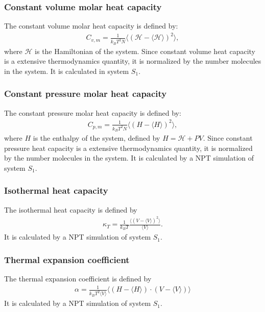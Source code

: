 \documentclass[aip,jcp,a4paper,preprint,unsortedaddress,onecolumn,fleqn]{revtex4-1}
\newcommand{\systemsb}{S_1}
\begin{document}

\subsubsection{Constant volume molar heat capacity}
The constant volume molar heat capacity is defined by:
\begin{align}
  C_{v,m} = \frac{1}{k_BT^2 N} \langle (\mathcal H - \langle\mathcal H\rangle)^2 \rangle,
\end{align}
where $\mathcal H$ is the Hamiltonian of the system. Since constant
volume heat capacity is a extensive thermodynamics quantity, it is
normalized by the number molecules in the system.
It is calculated in system $\systemsb$.

\subsubsection{Constant pressure molar heat capacity}
The constant pressure molar heat capacity is defined by:
\begin{align}
  C_{p,m} = \frac{1}{k_BT^2 N} \langle ( H - \langle H\rangle)^2 \rangle,
\end{align}
where $ H$ is the enthalpy of the system, defined by $H = \mathcal H + PV$. Since constant
pressure heat capacity is a extensive thermodynamics quantity, it is
normalized by the number molecules in the system.
It is calculated by a NPT simulation of  system $\systemsb$.


\subsubsection{Isothermal heat capacity}
The isothermal heat capacity is defined by
\begin{align}
  \kappa_T = \frac{1}{k_BT} \frac{\langle (V - \langle V\rangle)^2 \rangle}{\langle V\rangle}.
\end{align}
It is calculated by a NPT simulation of  system $\systemsb$.


\subsubsection{Thermal expansion coefficient}
The thermal expansion coefficient is defined by
\begin{align}
  \alpha = \frac{1}{k_BT^2\langle V\rangle} \langle (H - \langle H\rangle)\cdot(V - \langle V\rangle) \rangle
\end{align}
It is calculated by a NPT simulation of  system $\systemsb$.
\end{document}
